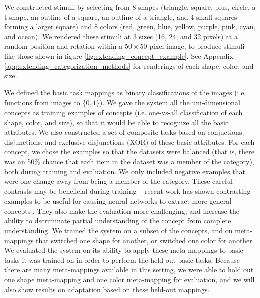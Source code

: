We constructed stimuli by selecting from 8 shapes (triangle, square, plus, circle, a t shape, an outline of a square, an outline of a triangle, and 4 small squares forming a larger square) and 8 colors (red, green, blue, yellow, purple, pink, cyan, and ocean). We rendered these stimuli at 3 sizes (16, 24, and 32 pixels) at a random position and rotation within a \(50 \times 50\) pixel image, to produce stimuli like those shown in figure \ref{fig:extending_concept_example}. See Appendix \ref{app:extending_categorization_methods} for renderings of each shape, color, and size. \par
We defined the basic task mappings as binary classifications of the images (i.e. functions from images to \(\{0, 1\}\)). We gave the system all the uni-dimensional concepts as training examples of concepts (i.e. one-vs-all classification of each shape, color, and size), so that it would be able to recognize all the basic attributes. We also constructed a set of composite tasks based on conjuctions, disjunctions, and exclusive-disjunctions (XOR) of these basic attributes. For each concept, we chose the examples so that the datasets were balanced (that is, there was an 50\% chance that each item in the dataset was a member of the category), both during training and evaluation. We only included negative examples that were one change away from being a member of the category. These careful contrasts may be beneficial during training -- recent work has shown contrasting examples to be useful for causing neural networks to extract more general concepts \citep{Hill2019}. They also make the evaluation more challenging, and increase the ability to dscriminate partial understanding of the concept from complete understanding. We trained the system on a subset of the concepts, and on meta-mappings that switched one shape for another, or switched one color for another. We evaluated the system on its ability to apply these meta-mappings to basic tasks it was trained on in order to perform the held-out basic tasks. Because there are many meta-mappings available in this setting, we were able to hold out one shape meta-mapping and one color meta-mapping for evaluation, and we will also show results on adaptation based on these held-out mappings. \par  

